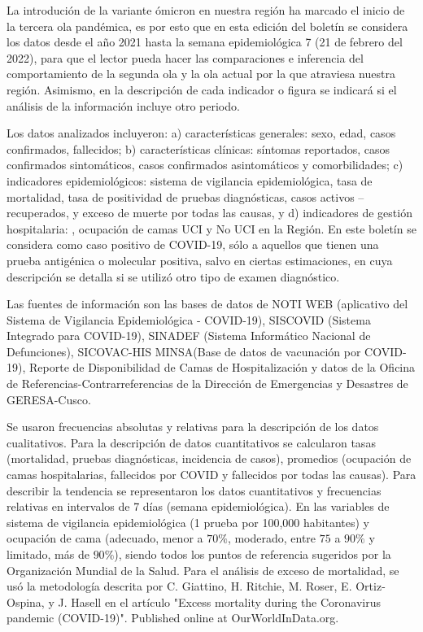 \documentclass[12pt,a4paper,openany]{book}
\begin{document}
	La introdución de la variante ómicron en nuestra región ha marcado el inicio de la tercera ola pandémica, es por esto que en esta edición del boletín se considera los datos desde el año 2021 hasta la semana epidemiológica 7 (21 de febrero del 2022), para que el lector pueda hacer las comparaciones e inferencia del comportamiento de la segunda ola y la ola actual por la que atraviesa nuestra región. Asimismo, en la descripción de cada indicador o figura se indicará si el análisis de la información incluye otro periodo. 
	
	Los datos analizados incluyeron: a) características generales: sexo, edad, casos confirmados, fallecidos; b) características clínicas: síntomas reportados, casos confirmados sintomáticos, casos confirmados asintomáticos y comorbilidades; c) indicadores epidemiológicos: sistema de vigilancia epidemiológica, tasa de mortalidad, tasa de positividad de pruebas diagnósticas, casos activos – recuperados, y exceso de muerte por todas las causas, y d) indicadores de gestión hospitalaria: , ocupación de camas UCI y No UCI en la Región. En este boletín se considera como caso positivo de COVID-19, sólo a aquellos que tienen una prueba antigénica o molecular positiva, salvo en ciertas estimaciones, en cuya descripción se detalla si se utilizó otro tipo de examen diagnóstico. 
	
	Las fuentes de información son las bases de datos de NOTI WEB (aplicativo del Sistema de Vigilancia Epidemiológica - COVID-19), SISCOVID (Sistema Integrado para COVID-19), SINADEF (Sistema Informático Nacional de Defunciones), SICOVAC-HIS MINSA(Base de datos de vacunación por COVID-19), Reporte de Disponibilidad de Camas de Hospitalización y datos de la Oficina de Referencias-Contrarreferencias de la Dirección de Emergencias y Desastres de GERESA-Cusco. 
	
	Se usaron frecuencias absolutas y relativas para la descripción de los datos cualitativos. Para la descripción de datos cuantitativos se calcularon tasas (mortalidad, pruebas diagnósticas, incidencia de casos), promedios (ocupación de camas hospitalarias, fallecidos por COVID y fallecidos por todas las causas). Para describir la tendencia se representaron los datos cuantitativos y frecuencias relativas en intervalos de 7 días (semana epidemiológica). En las variables de sistema de vigilancia epidemiológica (1 prueba por 100,000 habitantes) y ocupación de cama (adecuado, menor a $70\%$, moderado, entre $75$ a $90\%$ y limitado, más de $90\%$), siendo todos los puntos de referencia sugeridos por la Organización Mundial de la Salud. Para el análisis de exceso de mortalidad, se usó la metodología descrita por C. Giattino, H. Ritchie, M. Roser, E. Ortiz-Ospina, y J. Hasell en el artículo "Excess mortality during the Coronavirus pandemic (COVID-19)". Published online at OurWorldInData.org.
	
\end{document}
